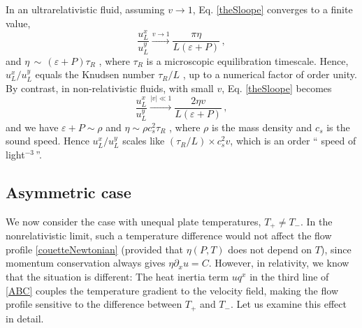 \documentclass[a4paper, amsfonts, amssymb, amsmath, reprint, showkeys, nofootinbib, twoside,notitlepage,onecolumn]{revtex4-1}
\theoremstyle{definition}
\theoremstyle{theorem}
\begin{document}
In an ultrarelativistic fluid, assuming $v\rightarrow 1$, Eq. \eqref{theSloope} converges to a finite value,
\begin{equation}
\dfrac{u_L^x}{u_L^y}\xrightarrow{v \to 1} \dfrac{\pi\eta}{L(\varepsilon{+}P)} \, ,
\end{equation}
and $\eta\, {\sim}\, (\varepsilon{+}P)\tau_R$ \cite{Denicol2012Boltzmann,DenicolANewWay2010xn,Denicol14Momenta2014vaa}, where $\tau_R$ is a microscopic equilibration timescale. Hence, $u_L^x/u_L^y$ equals the Knudsen number $\tau_R/L$ \cite{landau6}, up to a numerical factor of order unity. By contrast, in non-relativistic fluids, with small $v$, Eq. \eqref{theSloope} becomes
\begin{equation}
\dfrac{u_L^x}{u_L^y}\xrightarrow{|v| \ll 1} \dfrac{2\eta v}{L(\varepsilon{+}P)} \, ,
\end{equation}
and we have $\varepsilon{+}P\sim \rho$ and $\eta\sim \rho c_s^2 \tau_R$ \cite[\S 5.5]{huang_book}, where $\rho$ is the mass density and $c_s$ is the sound speed. Hence $u_L^x/u_L^y$ scales like $(\tau_R/L)\times c_s^2 v$, which is an order `` speed of light$^{-3}\,$''.



\subsection{Asymmetric case}
\vspace{-0.3cm}

We now consider the case with unequal plate temperatures, $T_+ \neq T_-$. In the nonrelativistic limit, such a temperature difference would not affect the flow profile \eqref{couetteNewtonian} (provided that $\eta(P,T)$ does not depend on $T$), since momentum conservation always gives $\eta\partial_x u = C$. However, in relativity, we know that the situation is different: The heat inertia term $u q^x$ in the third line of \eqref{ABC} couples the temperature gradient to the velocity field, making the flow profile sensitive to the difference between $T_+$ and $T_-$. Let us examine this effect in detail.
\end{document}
